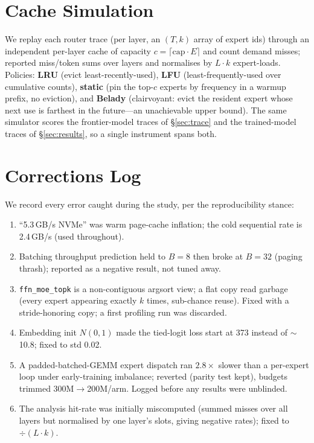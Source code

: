 \documentclass[11pt]{article}
\begin{document}
\section{Cache Simulation}
\label{app:cachesim}
We replay each router trace (per layer, an $(T,k)$ array of expert ids) through
an independent per-layer cache of capacity $c=\lceil \text{cap}\cdot E\rceil$ and
count demand misses; reported miss/token sums over layers and normalises by
$L\cdot k$ expert-loads. Policies: \textbf{LRU} (evict least-recently-used),
\textbf{LFU} (least-frequently-used over cumulative counts), \textbf{static}
(pin the top-$c$ experts by frequency in a warmup prefix, no eviction), and
\textbf{Belady} (clairvoyant: evict the resident expert whose next use is
farthest in the future---an unachievable upper bound). The same simulator scores
the frontier-model traces of \S\ref{sec:trace} and the trained-model traces of
\S\ref{sec:results}, so a single instrument spans both.

\section{Corrections Log}
\label{app:corrections}
We record every error caught during the study, per the reproducibility stance:
\begin{enumerate}\itemsep1pt
\item ``5.3\,GB/s NVMe'' was warm page-cache inflation; the cold sequential rate
is 2.4\,GB/s (used throughout).
\item Batching throughput prediction held to $B{=}8$ then broke at $B{=}32$
(paging thrash); reported as a negative result, not tuned away.
\item \texttt{ffn\_moe\_topk} is a non-contiguous argsort view; a flat copy read
garbage (every expert appearing exactly $k$ times, sub-chance reuse). Fixed with
a stride-honoring copy; a first profiling run was discarded.
\item Embedding init $N(0,1)$ made the tied-logit loss start at 373 instead of
$\sim$10.8; fixed to std 0.02.
\item A padded-batched-GEMM expert dispatch ran $2.8\times$ slower than a
per-expert loop under early-training imbalance; reverted (parity test kept),
budgets trimmed 300M$\to$200M/arm. Logged before any results were unblinded.
\item The analysis hit-rate was initially miscomputed (summed misses over all
layers but normalised by one layer's slots, giving negative rates); fixed to
$\div(L\cdot k)$.
\end{enumerate}
\end{document}
